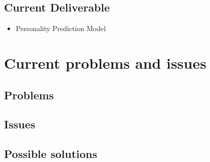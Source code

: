 \documentclass[a4paper, 12pt, onepage]{article}
\begin{document}
	\subsection{Current Deliverable}
	\begin{itemize}
	\item Personality Prediction Model
	\end{itemize}


      \cleardoublepage
      \section{Current problems and issues}
      \subsection{Problems}
      \subsection{Issues}
      \subsection{Possible solutions}
      \clearpage
\end{document}
